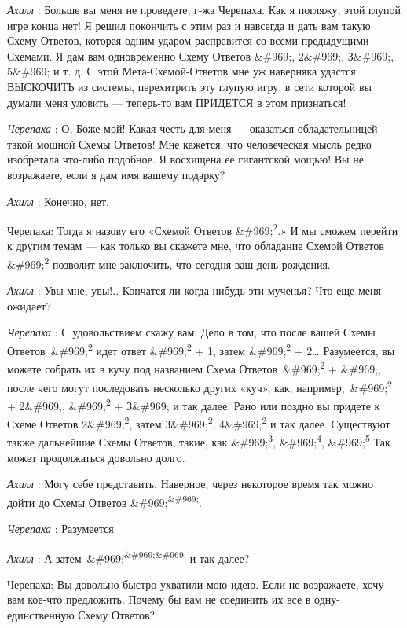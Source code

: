 \emph{Ахилл} : Больше вы меня не проведете, г-жа Черепаха. Как я погляжу, этой глупой игре конца нет! Я решил покончить с этим раз и навсегда и дать вам такую Схему Ответов, которая одним ударом расправится со всеми предыдущими Схемами. Я дам вам одновременно Схему Ответов \&\#969;, 2\&\#969;, З\&\#969;, 5\&\#969; и т. д. С этой Мета-Схемой-Ответов мне уж наверняка удастся ВЫСКОЧИТЬ из системы, перехитрить эту глупую игру, в сети которой вы думали меня уловить --- теперь-то вам ПРИДЕТСЯ в этом признаться!

\emph{Черепаха} : О, Боже мой! Какая честь для меня --- оказаться обладательницей такой мощной Схемы Ответов! Мне кажется, что человеческая мысль редко изобретала что-либо подобное. Я восхищена ее гигантской мощью! Вы не возражаете, если я дам имя вашему подарку?

\emph{Ахилл} : Конечно, нет.

Черепаха: Тогда я назову его «Схемой Ответов \&\#969;\textsuperscript{2}.» И мы сможем перейти к другим темам --- как только вы скажете мне, что обладание Схемой Ответов \&\#969;\textsuperscript{2} позволит мне заключить, что сегодня ваш день рождения.

\emph{Ахилл} : Увы мне, увы!.. Кончатся ли когда-нибудь эти мученья? Что еще меня ожидает?

\emph{Черепаха} : С удовольствием скажу вам. Дело в том, что после вашей Схемы Ответов~\&\#969;\textsuperscript{2} идет ответ \&\#969;\textsuperscript{2} + 1, затем \&\#969;\textsuperscript{2} + 2\ldots{} Разумеется, вы можете собрать их в кучу под названием Схема Ответов~\&\#969;\textsuperscript{2} + \&\#969;, после чего могут последовать несколько других «куч», как, например,~\&\#969;\textsuperscript{2} + 2\&\#969;, \&\#969;\textsuperscript{2} + З\&\#969; и так далее. Рано или поздно вы придете к Схеме Ответов 2\&\#969;\textsuperscript{2}, затем З\&\#969;\textsuperscript{2}, 4\&\#969;\textsuperscript{2} и так далее. Существуют также дальнейшие Схемы Ответов, такие, как \&\#969;\textsuperscript{3}, \&\#969;\textsuperscript{4}, \&\#969;\textsuperscript{5} Так может продолжаться довольно долго.

\emph{Ахилл} : Могу себе представить. Наверное, через некоторое время так можно дойти до Схемы Ответов \&\#969;\textsuperscript{\&\#969;}.

\emph{Черепаха} : Разумеется.

\emph{Ахилл} : А затем~\&\#969;\textsuperscript{\&\#969;\&\#969;} и так далее?

Черепаха: Вы довольно быстро ухватили мою идею. Если не возражаете, хочу вам кое-что предложить. Почему бы вам не соединить их все в одну-единственную Схему Ответов?

